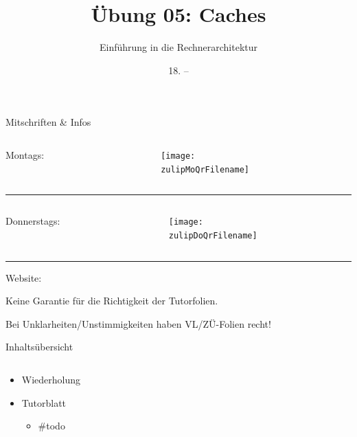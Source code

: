 \documentclass[
  german,            %
  aspectratio=169,    %
]{tumbeamer}
\title{Übung 05: Caches}
\subtitle{Einführung in die Rechnerarchitektur}
\author{\theAuthorName}
\institute{\theGroupName\\\theSchoolName\\\theUniversityName}
\date{18. -- \DTMdisplaydate{2024}{11}{24}{-1}}
\begin{document}
\maketitle

\begin{frame}[c]{Mitschriften \& Infos}{}
  \begin{minipage}[t]{\textwidth}
    \begin{columns}[c]
      \begin{column}{0.8\textwidth}
        Montags: \href{\zulipMo}{\zulipMo}
      \end{column}
      \begin{column}{0.2\textwidth}
        \texttt{[image: \\zulipMoQrFilename]}
      \end{column}
    \end{columns}
  \end{minipage}
  \rule{\textwidth}{0.4pt}
  \begin{minipage}[t]{\textwidth}
    \begin{columns}[c]
      \begin{column}{0.8\textwidth}
        Donnerstags: \href{\zulipDo}{\zulipDo}
      \end{column}
      \begin{column}{0.2\textwidth}
        \texttt{[image: \\zulipDoQrFilename]}
      \end{column}
    \end{columns}
  \end{minipage}
  \ifdefined\myWebsite
  \rule{\textwidth}{0.4pt}
  \centering
  Website: \href{\myWebsite}{\myWebsite}
  \fi
\end{frame}

\begin{frame}[c]{}{}
  \begin{center}
    \LARGE  Keine Garantie für die Richtigkeit der Tutorfolien.

    \Large Bei Unklarheiten/Unstimmigkeiten haben VL/ZÜ-Folien recht!
  \end{center}
\end{frame}

\begin{frame}[c]{Inhaltsübersicht}{}
  \begin{columns}[c]
    \begin{column}{1\textwidth}
      \begin{itemize}
        \item Wiederholung
        \item Tutorblatt
        \begin{itemize}
          \item \#todo
        \end{itemize}
      \end{itemize}
    \end{column}
  \end{columns}
\end{frame}
\end{document}
